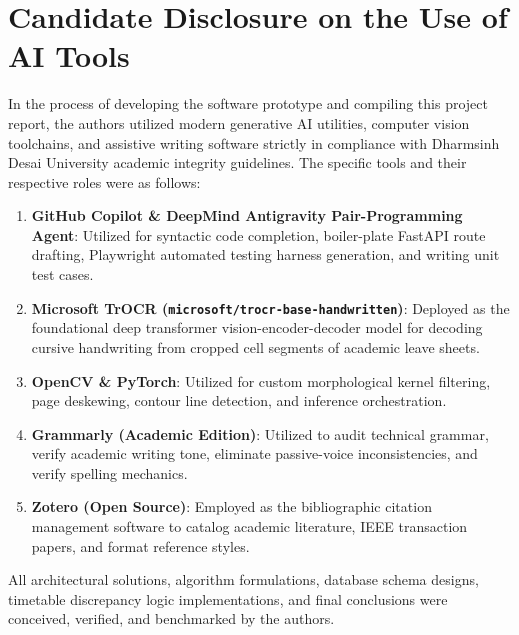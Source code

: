 \documentclass[12pt,letterpaper]{report}
\begin{document}

\chapter*{Candidate Disclosure on the Use of AI Tools}

In the process of developing the software prototype and compiling this project report, the authors utilized modern generative AI utilities, computer vision toolchains, and assistive writing software strictly in compliance with Dharmsinh Desai University academic integrity guidelines. The specific tools and their respective roles were as follows:

\begin{enumerate}[label=\textbf{\arabic*.}]
    \item \textbf{GitHub Copilot \& DeepMind Antigravity Pair-Programming Agent}: Utilized for syntactic code completion, boiler-plate FastAPI route drafting, Playwright automated testing harness generation, and writing unit test cases.
    \item \textbf{Microsoft TrOCR (\texttt{microsoft/trocr-base-handwritten})}: Deployed as the foundational deep transformer vision-encoder-decoder model for decoding cursive handwriting from cropped cell segments of academic leave sheets.
    \item \textbf{OpenCV \& PyTorch}: Utilized for custom morphological kernel filtering, page deskewing, contour line detection, and inference orchestration.
    \item \textbf{Grammarly (Academic Edition)}: Utilized to audit technical grammar, verify academic writing tone, eliminate passive-voice inconsistencies, and verify spelling mechanics.
    \item \textbf{Zotero (Open Source)}: Employed as the bibliographic citation management software to catalog academic literature, IEEE transaction papers, and format reference styles.
\end{enumerate}

All architectural solutions, algorithm formulations, database schema designs, timetable discrepancy logic implementations, and final conclusions were conceived, verified, and benchmarked by the authors.
\end{document}
